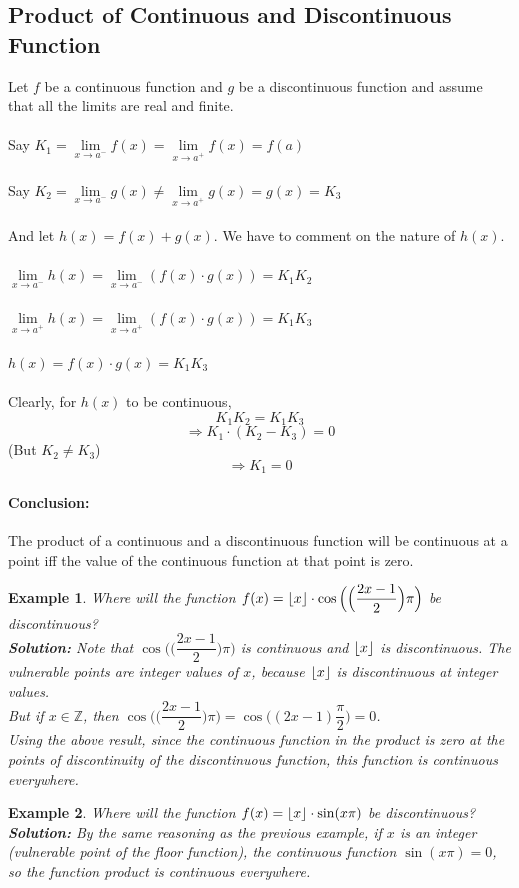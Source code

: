 \documentclass[14]{article}
\DeclarePairedDelimiter\floor{\lfloor}{\rfloor}
\newtheorem*{ex}{Example}
\theoremstyle{definition}
\theoremstyle{case}
\begin{document}
\subsection{Product of Continuous and Discontinuous Function}
Let $f$ be a continuous function and $g$ be a discontinuous function and assume that all the limits are real and finite.\\\\
Say $K_1 = \lim\limits_{x \to a^-} f(x) = \lim\limits_{x \to a^+} f(x) = f(a)$\\\\
Say $K_2 = \lim\limits_{x \to a^-} g(x) \neq \lim\limits_{x \to a^+} g(x) = g(x) = K_3$\\\\
And let $h(x) = f(x) + g(x)$. We have to comment on the nature of $h(x)$.\\\\
$\lim\limits_{x \to a^-} h(x) = \lim\limits_{x \to a^-} (f(x) \cdot g(x)) = K_1 K_2$\\\\
$\lim\limits_{x \to a^+} h(x) = \lim\limits_{x \to a^+} (f(x) \cdot g(x)) = K_1 K_3$\\\\
$h(x) = f(x) \cdot g(x) = K_1 K_3$\\\\
Clearly, for $h(x)$ to be continuous,
\[K_1 K_2 = K_1 K_3\]
\[\Rightarrow K_1 \cdot (K_2 - K_3) = 0\]
(But $K_2 \neq K_3$)
\[\Rightarrow K_1 = 0\]
\paragraph{Conclusion:}The product of a continuous and a discontinuous function will be continuous at a point iff the value of the continuous function at that point is zero.
\begin{ex}
Where will the function $f(x) = \floor{x} \cdot \cos\Big(\Big(\dfrac{2x-1}{2}\Big) \pi\Big)$ be discontinuous?\\
\textbf{Solution:} Note that $\cos\Big(\Big(\dfrac{2x-1}{2}\Big) \pi\Big)$ is continuous and $\floor{x}$ is discontinuous.
The vulnerable points are integer values of $x$, because $\floor{x}$ is discontinuous at integer values.\\
But if $x \in \mathbb{Z}$, then $\cos\Big(\Big(\dfrac{2x-1}{2}\Big) \pi\Big) = \cos\Big((2x-1)\dfrac{\pi}{2}\Big) = 0$.\\
Using the above result, since the continuous function in the product is zero at the points of discontinuity of the discontinuous function, this function is continuous everywhere.
\end{ex}
\begin{ex}
Where will the function $f(x) = \floor{x} \cdot \sin(x \pi)$ be discontinuous?\\
\textbf{Solution:} By the same reasoning as the previous example, if $x$ is an integer (vulnerable point of the floor function), the continuous function $\sin(x\pi) = 0$, so the function product is continuous everywhere.
\end{ex}
\end{document}
